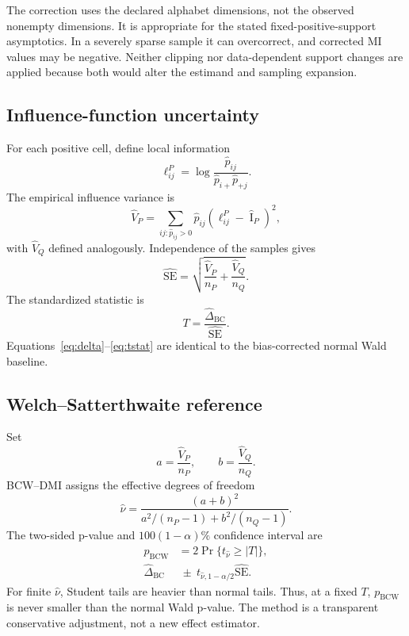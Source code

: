 \documentclass[10pt,twocolumn]{article}
\newcommand{\MI}{\operatorname{I}}
\newcommand{\method}{BCW--DMI}
\begin{document}
The correction uses the declared alphabet dimensions, not the observed
nonempty dimensions. It is appropriate for the stated fixed-positive-support
asymptotics. In a severely sparse sample it can overcorrect, and corrected MI
values may be negative. Neither clipping nor data-dependent support changes
are applied because both would alter the estimand and sampling expansion.

\subsection{Influence-function uncertainty}

For each positive cell, define local information
\begin{equation}
  \ell^P_{ij}=\log
  \frac{\widehat p_{ij}}{\widehat p_{i+}\widehat p_{+j}}.
\end{equation}
The empirical influence variance is
\begin{equation}
  \widehat V_P
  =\sum_{ij:\widehat p_{ij}>0}\widehat p_{ij}
   \left(\ell^P_{ij}-\widehat{\MI}_P\right)^2,
  \label{eq:variance}
\end{equation}
with \(\widehat V_Q\) defined analogously. Independence of the samples gives
\begin{equation}
  \widehat{\mathrm{SE}}
  =\sqrt{\frac{\widehat V_P}{n_P}
               +\frac{\widehat V_Q}{n_Q}}.
  \label{eq:se}
\end{equation}
The standardized statistic is
\begin{equation}
  T=\frac{\widehat\Delta_{\mathrm{BC}}}
          {\widehat{\mathrm{SE}}}.
  \label{eq:tstat}
\end{equation}
Equations~\eqref{eq:delta}--\eqref{eq:tstat} are identical to the
bias-corrected normal Wald baseline.

\subsection{Welch--Satterthwaite reference}

Set
\begin{equation}
  a=\frac{\widehat V_P}{n_P},
  \qquad
  b=\frac{\widehat V_Q}{n_Q}.
\end{equation}
\method{} assigns the effective degrees of freedom
\begin{equation}
  \widehat\nu
  =\frac{(a+b)^2}
  {a^2/(n_P-1)+b^2/(n_Q-1)}.
  \label{eq:df}
\end{equation}
The two-sided p-value and \(100(1-\alpha)\%\) confidence interval are
\begin{align}
  p_{\mathrm{BCW}}
    &=2\Pr\{t_{\widehat\nu}\ge |T|\},\\
  \widehat\Delta_{\mathrm{BC}}
    &\ \pm\
    t_{\widehat\nu,1-\alpha/2}\widehat{\mathrm{SE}}.
  \label{eq:pvalue}
\end{align}
For finite \(\widehat\nu\), Student tails are heavier than normal tails.
Thus, at a fixed \(T\), \(p_{\mathrm{BCW}}\) is never smaller than the normal
Wald p-value. The method is a transparent conservative adjustment, not a new
effect estimator.
\end{document}
